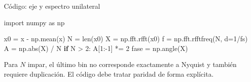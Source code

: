 \documentclass[
  ignorenonframetext,
  aspectratio=169,
  spanish,
]{beamer}
\newenvironment{Shaded}{\begin{snugshade}}{\end{snugshade}}
\newcommand{\BuiltInTok}[1]{\textcolor[rgb]{0.00,0.23,0.31}{#1}}
\newcommand{\ControlFlowTok}[1]{\textcolor[rgb]{0.00,0.23,0.31}{\textbf{#1}}}
\newcommand{\DecValTok}[1]{\textcolor[rgb]{0.68,0.00,0.00}{#1}}
\newcommand{\ImportTok}[1]{\textcolor[rgb]{0.00,0.46,0.62}{#1}}
\newcommand{\NormalTok}[1]{\textcolor[rgb]{0.00,0.23,0.31}{#1}}
\newcommand{\OperatorTok}[1]{\textcolor[rgb]{0.37,0.37,0.37}{#1}}
\begin{document}
\begin{frame}[fragile]{Código: eje y espectro unilateral}
  \protect{}\label{cuxf3digo-eje-y-espectro-unilateral}
  \begin{Shaded}
    \begin{Highlighting}[]
      \ImportTok{import}\NormalTok{ numpy }\ImportTok{as}\NormalTok{ np}

      \NormalTok{x0 }\OperatorTok{=}\NormalTok{ x }\OperatorTok{{-}}\NormalTok{ np.mean(x)}
      \NormalTok{N }\OperatorTok{=} \BuiltInTok{len}\NormalTok{(x0)}
      \NormalTok{X }\OperatorTok{=}\NormalTok{ np.fft.rfft(x0)}
      \NormalTok{f }\OperatorTok{=}\NormalTok{ np.fft.rfftfreq(N, d}\OperatorTok{=}\DecValTok{1}\OperatorTok{/}\NormalTok{fs)}
      \NormalTok{A }\OperatorTok{=}\NormalTok{ np.}\BuiltInTok{abs}\NormalTok{(X) }\OperatorTok{/}\NormalTok{ N}
      \ControlFlowTok{if}\NormalTok{ N }\OperatorTok{\textgreater{}} \DecValTok{2}\NormalTok{:}
      \NormalTok{    A[}\DecValTok{1}\NormalTok{:}\OperatorTok{{-}}\DecValTok{1}\NormalTok{] }\OperatorTok{*=} \DecValTok{2}
      \NormalTok{fase }\OperatorTok{=}\NormalTok{ np.angle(X)}
    \end{Highlighting}
  \end{Shaded}

  \begin{tcolorbox}[enhanced jigsaw, arc=.35mm, bottomrule=.15mm, bottomtitle=1mm, breakable, colback=white, colbacktitle=quarto-callout-warning-color!10!white, colframe=quarto-callout-warning-color-frame, coltitle=black, left=2mm, leftrule=.75mm, opacityback=0, opacitybacktitle=0.6, rightrule=.15mm, title=\textcolor{quarto-callout-warning-color}{\faExclamationTriangle}\hspace{0.5em}{Advertencia}, titlerule=0mm, toprule=.15mm, toptitle=1mm]

    Para \(N\) impar, el último bin no corresponde exactamente a Nyquist y
    también requiere duplicación. El código debe tratar paridad de forma
    explícita.

  \end{tcolorbox}
\end{frame}
\end{document}
